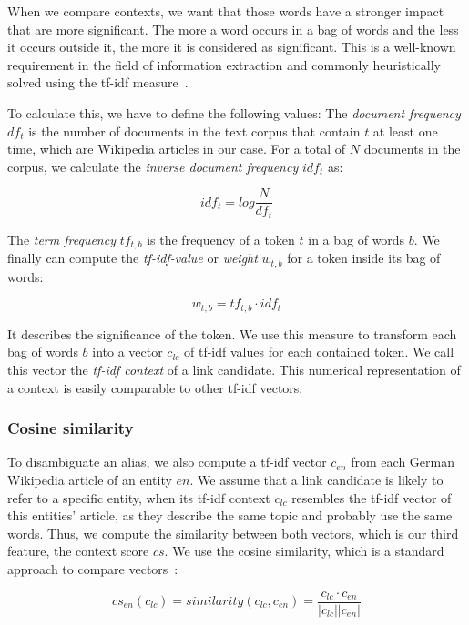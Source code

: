 When we compare contexts, we want that those words have a stronger impact that are more significant. The more a word occurs in a bag of words and the less it occurs outside it, the more it is considered as significant. This is a well-known requirement in the field of information extraction and commonly heuristically solved using the tf-idf measure~\cite{salton1988term}.

To calculate this, we have to define the following values: The \textit{document frequency} $df_t$ is the number of documents in the text corpus that contain $t$ at least one time, which are Wikipedia articles in our case. For a total of $N$ documents in the corpus, we calculate the \textit{inverse document frequency} $idf_t$ as:

\begin{equation*}
idf_t = log\frac{N}{df_t}
\end{equation*}

The \textit{term frequency} $tf_{t,b}$ is the frequency of a token $t$ in a bag of words $b$. We finally can compute the \textit{tf-idf-value} or \textit{weight} $w_{t,b}$ for a token inside its bag of words:

\begin{equation*}
w_{t,b} = tf_{t,b} \cdot idf_t
\end{equation*}

It describes the significance of the token. We use this measure to transform each bag of words $b$ into a vector $c_{lc}$ of tf-idf values for each contained token. We call this vector the \textit{tf-idf context} of a link candidate. This numerical representation of a context is easily comparable to other tf-idf vectors.


\subsubsection{Cosine similarity}
To disambiguate an alias, we also compute a tf-idf vector $c_{en}$ from each German Wikipedia article of an entity $en$. We assume that a link candidate is likely to refer to a specific entity, when its tf-idf context $c_{lc}$ resembles the tf-idf vector of this entities' article, as they describe the same topic and probably use the same words. Thus, we compute the similarity between both vectors, which is our third feature, the context score $cs$. We use the cosine similarity, which is a standard approach to compare vectors~\cite{ricardo1999modern, salton1988term}:

\begin{equation*}
cs_{en}(c_{lc}) = similarity(c_{lc}, c_{en}) = \frac{c_{lc} \cdot c_{en}}{|c_{lc}||c_{en}|}
\end{equation*}

